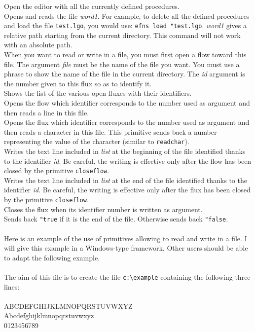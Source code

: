 Open the editor with all the currently defined procedures.\\
Opens and reads the file \textit{word1}.  For example, to delete all the defined procedures and load the file \texttt{test.lgo}, you would use: \texttt{efns load "test.lgo}. \textit{word1} gives a relative path starting from the current directory.  This command will not work with an absolute path.\\
When you want to read or write in a file, you must first open a flow toward this file. The argument \textit{file} must be the name of the file you want. You must use a phrase to show the name of the file in the current directory. The \textit{id} argument is the number given to this flux so as to identify it.\\
Shows the list of the various open fluxes with their identifiers.\\
Opens the flow which identifier corresponds to the number used as argument and then reads a line in this file. \\
Opens the flux which identifier corresponds to the number used as argument and then reads a character in this file. This primitive sends back a number representing the value of the character (similar to \texttt{readchar}).\\
Writes the text line included in \textit{list} at the beginning of the file identified thanks to the identifier \textit{id}. Be careful, the writing is effective only after the flow has been closed by the  primitive \texttt{closeflow}.\\
Writes the text line included in \textit{list} at the end of the file identified thanks to the identifier \textit{id}. Be careful, the writing is effective only after the flux has been closed by the primitive \texttt{closeflow}.\\
Closes the flux when its identifier number is written as argument. \\
Sends back \texttt{"true} if it is the end of the file. Otherwise sends back \texttt{"false}. \\ \\
Here is an example of the use of primitives allowing to read and write in a file. I will give this example in a Windows-type framework. Other users should be able to adapt the following example.\\ \\
\noindent The aim of this file is to create the file \texttt{c:\textbackslash example} containing the following three lines:\\ \\
ABCDEFGHIJKLMNOPQRSTUVWXYZ  \\
Abcdefghijklmnopqrstuvwxyz  \\
0123456789 \\

